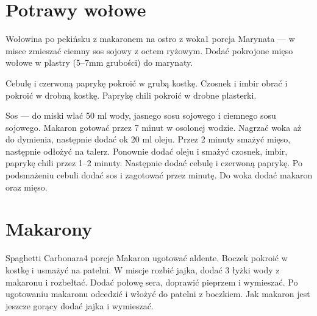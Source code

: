 \documentclass[a4paper,12pt]{article}
\begin{document}
\newpage

\section{Potrawy wołowe}

\begin{recipe}{Wołowina po pekińsku z makaronem na ostro z woka}{1 porcja}{}
Marynata --- w misce zmieszać ciemny sos sojowy z octem ryżowym. Dodać
pokrojone mięso wołowe w plastry (5--7mm grubości) do marynaty.

Cebulę i czerwoną paprykę pokroić w grubą kostkę. Czosnek i imbir obrać i
pokroić w drobną kostkę. Paprykę chili pokroić w drobne plasterki.

Sos --- do miski wlać 50 ml wody, jasnego sosu sojowego i ciemnego sosu sojowego. 
Makaron gotować przez 7 minut w osolonej wodzie.
\freeform%
Nagrzać woka aż do dymienia, następnie dodać ok 20 ml oleju. Przez 2 minuty
smażyć mięso, następnie odłożyć na talerz. Ponownie dodać oleju i smażyć
czosnek, imbir, paprykę chili przez 1--2 minuty. Następnie dodać cebulę i
czerwoną paprykę. Po podsmażeniu cebuli dodać sos i zagotować przez minutę. Do
woka dodać makaron oraz mięso.

\end{recipe}

\newpage

\section{Makarony}

\begin{recipe}{Spaghetti Carbonara}{4 porcje}{}
Makaron ugotować aldente. Boczek pokroić w kostkę i usmażyć na patelni. 
W miscje rozbić jajka, dodać 3 łyżki wody z makaronu i rozbełtać. 
Dodać połowę sera, doprawić pieprzem i wymieszać. 
Po ugotowaniu makaronu odcedzić i włożyć do patelni z boczkiem.
Jak makaron jest jeszcze gorący dodać jajka i wymieszać.


\end{recipe}
\end{document}
